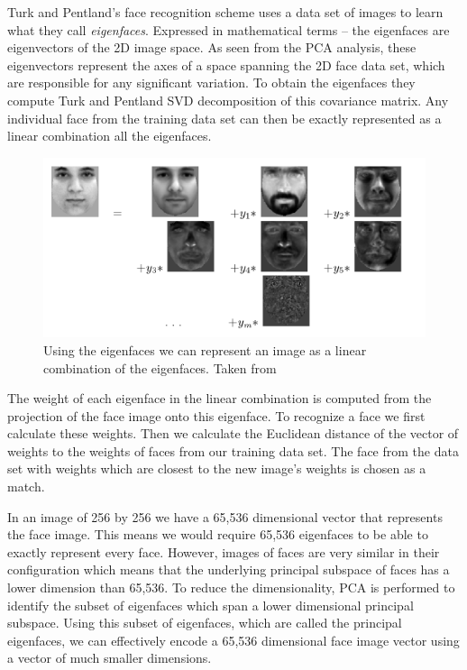 \documentclass[11pt,a4paper]{report}
\begin{document}
Turk and Pentland's face recognition
scheme uses a data set of images to learn what they call
\textit{eigenfaces}. Expressed in mathematical terms -- the eigenfaces are eigenvectors of the 2D image
space. As seen from the PCA analysis, these eigenvectors represent the axes of a
space spanning the 2D face data set, which are responsible for any
significant variation. To obtain the eigenfaces they compute Turk and Pentland SVD decomposition of this
covariance matrix. Any individual face from the training data set can then be
exactly represented as a linear combination all the eigenfaces.

\begin{figure}[H]
\centering
\includegraphics[scale=0.5]{images/eigenfaces_comb_from_nn_vienna.png}
\caption{ Using the eigenfaces we can represent an image as a linear combination of the
  eigenfaces. Taken from \cite{vienna} }
\label{gr:eigenfaces}
\end{figure}

The weight of each eigenface in the linear combination is computed from the
projection of the face image onto this eigenface. To recognize a face we
 first calculate these weights. Then we calculate the Euclidean distance of the vector
of weights to the weights of faces from our training data set. The face from
the data set with weights which are closest to the new image's weights is chosen
as a match.

In an image of 256 by 256 we have a 65,536 dimensional vector that
represents the face image. This means we would require 65,536 eigenfaces to be
able to exactly represent every face. However, images of faces are very similar
in their configuration which means that the underlying principal subspace of
faces has a lower dimension than 65,536. To reduce the dimensionality, PCA is
performed to identify the subset of eigenfaces which span a lower dimensional principal
subspace. Using this subset of eigenfaces, which are called the principal
eigenfaces, we can effectively encode a 65,536 dimensional face image vector using a vector of much smaller
dimensions.
\end{document}
